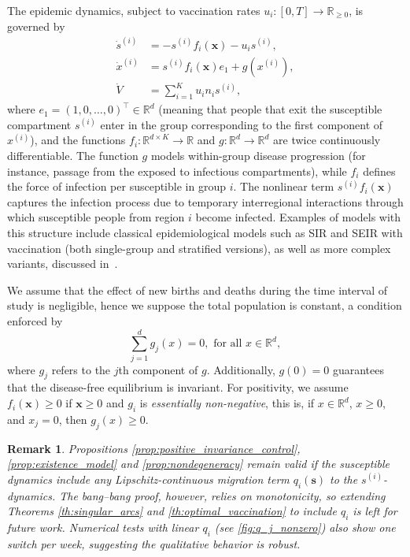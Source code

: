 \documentclass[letterpaper, 10 pt, conference]{ieeeconf}
\newcommand{\R}{\mathbb{R}}
\newtheorem{remark}{Remark}
\begin{document}
The epidemic dynamics, subject to vaccination rates $u_i \colon [0,T] \to \mathbb{R}_{\ge 0}$, is governed by
\begin{equation}
    \label{eq:system_epidemic}
    \begin{aligned}
        \dot{s}^{(i)} &= -s^{(i)} f_i(\boldsymbol{x}) -  u_i s^{(i)}, \\
        \dot{x}^{(i)} &= s^{(i)} f_i(\boldsymbol{x}) e_1 + g(x^{(i)}), \\
        \dot{V} &= \sum_{i=1}^K u_i n_i s^{(i)},
    \end{aligned}
\end{equation}
where $e_1 =(1,0,\dots,0)^\top \in \mathbb{R}^d$ (meaning that people that exit the susceptible compartment $s^{(i)}$ enter in the group corresponding to the first component of $x^{(i)}$), and the functions $ f_i : \mathbb{R}^{d \times K} \to \mathbb{R}$ and $g : \mathbb{R}^{d} \to \mathbb{R}^d$ are twice continuously differentiable.
The function $g$ models within-group disease progression (for instance, passage from the exposed to infectious compartments), while $f_i$ defines the force of infection per susceptible in group $i$.
The nonlinear term $s^{(i)} f_i(\boldsymbol{x})$ captures the infection process due to temporary interregional interactions through which susceptible people from region $i$ become infected. 
Examples of models with this structure include classical epidemiological models such as SIR and SEIR with vaccination (both single-group and stratified versions), as well as more complex variants, discussed in~\cite{lemaitre2022optimal,nonato_robot_2022,aronna2024optimal}.

We assume that the effect of new births and deaths during the time interval of study is negligible, hence we suppose the total population is constant, a condition enforced by
\begin{equation}
    \label{eq:constant_population}
    \sum_{j=1}^d g_j(x) = 0, \text{ for all } x \in \R^d,
\end{equation}
where $g_j$ refers to the $j$th component of $g$.
Additionally, $g(0) = 0$ guarantees that the disease-free equilibrium is invariant.
For positivity, we assume $f_i(\boldsymbol{x}) \geq 0$ if $\boldsymbol{x} \ge 0$ and $g_i$ is {\it essentially non-negative}, this is, if $x\in \R^d$, $x \ge 0$, and $x_j = 0$, then $g_j(x) \geq 0$.

\begin{remark}\label{rem:qj}
    Propositions \ref{prop:positive_invariance_control}, \ref{prop:existence_model} and \ref{prop:nondegeneracy} remain valid if the susceptible dynamics include any Lipschitz-continuous migration term \(q_i(\mathbf{s})\) to the $s^{(i)}$-dynamics.
    The bang--bang proof, however, relies on monotonicity, so extending Theorems \ref{th:singular_arcs} and \ref{th:optimal_vaccination} to include $q_i$ is left for future work.
    Numerical tests with linear $q_i$ (see \autoref{fig:q_j_nonzero}) also show one switch per week, suggesting the qualitative behavior is robust.
\end{remark}
\end{document}
